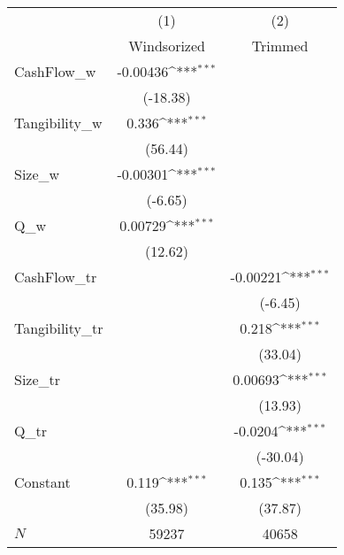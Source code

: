 {
\def\sym#1{\ifmmode^{#1}\else\(^{#1}\)\fi}
\begin{tabular}{l*{2}{c}}
\hline\hline
            &\multicolumn{1}{c}{(1)}         &\multicolumn{1}{c}{(2)}         \\
            & Windsorized         &     Trimmed         \\
\hline
CashFlow\_w  &    -0.00436\sym{***}&                     \\
            &    (-18.38)         &                     \\
Tangibility\_w&       0.336\sym{***}&                     \\
            &     (56.44)         &                     \\
Size\_w      &    -0.00301\sym{***}&                     \\
            &     (-6.65)         &                     \\
Q\_w         &     0.00729\sym{***}&                     \\
            &     (12.62)         &                     \\
CashFlow\_tr &                     &    -0.00221\sym{***}\\
            &                     &     (-6.45)         \\
Tangibility\_tr&                     &       0.218\sym{***}\\
            &                     &     (33.04)         \\
Size\_tr     &                     &     0.00693\sym{***}\\
            &                     &     (13.93)         \\
Q\_tr        &                     &     -0.0204\sym{***}\\
            &                     &    (-30.04)         \\
Constant    &       0.119\sym{***}&       0.135\sym{***}\\
            &     (35.98)         &     (37.87)         \\
\hline
\(N\)       &       59237         &       40658         \\
\hline\hline
\end{tabular}
}
